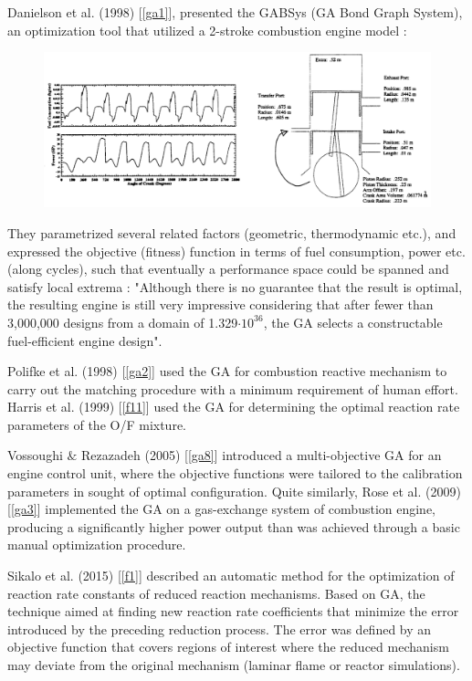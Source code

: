 \documentclass[12pt]{article}
\numberwithin{equation}{section}
\begin{document}
\begin{flushleft}
Danielson et al. (1998) [\ref{ga1}], presented the GABSys (GA Bond Graph System), an optimization tool that utilized a 2-stroke combustion engine model : 
\begin{figure}[H]
\centering
\includegraphics[width=0.915\linewidth, center]{engine.png}
\end{figure}
They parametrized several related factors (geometric, thermodynamic etc.), and expressed the objective (fitness) function in terms of fuel consumption, power etc. (along cycles), such that eventually a performance space could be spanned and satisfy local extrema : "Although there is no guarantee that the result is optimal, the resulting engine is still very impressive considering that after fewer than 3,000,000 designs from a domain of 1.329$\cdot 10^{36}$, the GA selects a constructable fuel-efficient engine design".

Polifke et al. (1998) [\ref{ga2}] used the GA for combustion reactive mechanism to carry out the matching procedure with a minimum requirement of human effort. Harris et al. (1999) [\ref{f11}] used the GA for determining the optimal reaction rate parameters of the O/F mixture.

Vossoughi $\&$ Rezazadeh (2005) [\ref{ga8}] introduced a multi-objective GA for an engine control unit, where the objective functions were tailored to the calibration parameters in sought of optimal configuration. Quite similarly, Rose et al. (2009) [\ref{ga3}] implemented the GA on a gas-exchange system of combustion engine, producing a significantly higher power output than was achieved through a basic manual optimization procedure. 

Sikalo et al. (2015) [\ref{f1}] described an automatic method for the optimization of reaction rate constants of reduced reaction mechanisms. Based on GA, the technique aimed at finding new reaction rate coefficients that minimize the error introduced by the preceding reduction process. The error was defined by an objective function that covers regions of interest where the reduced mechanism may deviate from the original mechanism (laminar flame or reactor simulations).


\end{flushleft}
\end{document}
